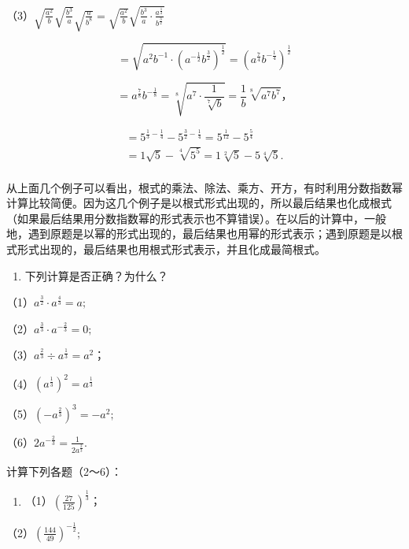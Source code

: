 （3）\(\sqrt{\frac{a^2}{b}}\sqrt{\frac{b^3}{a}}\sqrt{\frac{a}{b^8}} = \sqrt{\frac{a^2}{b}}\sqrt{\frac{b^3}{a}\cdot\frac{a^{\frac{1}{2}}}{b^{\frac{3}{2}}}}\)

\[
= \sqrt {a ^ {2} b ^ {- 1} \cdot \left(a ^ {- \frac{1}{2}} b ^ {\frac{3}{2}}\right) ^ {\frac{1}{2}}} = \left(a ^ {\frac{7}{4}} b ^ {- \frac{1}{4}}\right) ^ {\frac{1}{2}}
\]

\[
= a ^ {\frac{7}{8}} b ^ {- \frac{1}{8}} = \sqrt[8]{a ^ {7} \cdot \frac{1}{\sqrt[7]{b}}} = \frac{1}{b} \sqrt[8]{a ^ {7} b ^ {7}}\text{，}
\]

\[
\begin{array}{l} = 5 ^ {\frac{1}{3} - \frac{1}{4}} - 5 ^ {\frac{3}{2} - \frac{1}{4}} = 5 ^ {\frac{1}{12}} - 5 ^ {\frac{5}{4}} \\ = 1 \sqrt {5} - \sqrt[4]{5 ^ {5}} = 1 \sqrt[2]{5} - 5 \sqrt[4]{5}. \\ \end{array}
\]

从上面几个例子可以看出，根式的乘法、除法、乘方、开方，有时利用分数指数幂计算比较简便。因为这几个例子是以根式形式出现的，所以最后结果也化成根式
（如果最后结果用分数指数幂的形式表示也不算错误）。在以后的计算中，一般地，遇到原题是以幂的形式出现的，最后结果也用幂的形式表示；遇到原题是以根式形式出现的，最后结果也用根式形式表示，并且化成最简根式。

\begin{enumerate}
\item
  下列计算是否正确？为什么？
\end{enumerate}

（1）\(a^{\frac{3}{2}} \cdot a^{\frac{4}{3}} = a;\)

（2）\(a^{\frac{3}{3}} \cdot a^{-\frac{2}{3}} = 0;\)

（3）\(a^{\frac{2}{3}} \div a^{\frac{1}{3}} = a^{2}\)；

（4）\((a^{\frac{1}{3}})^{2} = a^{\frac{1}{3}}\)

（5）\((-a^{\frac{2}{3}})^{3} = -a^{2};\)

（6）\(2a^{-\frac{2}{3}} = \frac{1}{2a^{\frac{2}{3}}}.\)

计算下列各题（2～6）：

\begin{enumerate}[start=2]
\item
  （1）\(\left(\frac{27}{125}\right)^{\frac{1}{3}}\)；
\end{enumerate}

（2）\(\left(\frac{144}{49}\right)^{-\frac{1}{2}};\)

